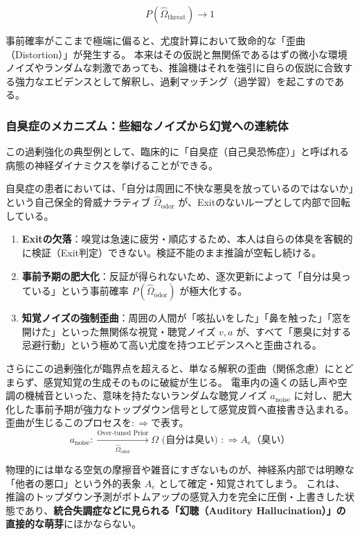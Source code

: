 \begin{equation}
    P(\hat{\Omega}_{\mathrm{threat}}) \longrightarrow 1
\end{equation}

事前確率がここまで極端に偏ると、尤度計算において致命的な「歪曲（Distortion）」が発生する。
本来はその仮説と無関係であるはずの微小な環境ノイズやランダムな刺激であっても、推論機はそれを強引に自らの仮説に合致する強力なエビデンスとして解釈し、過剰マッチング（過学習）を起こすのである。

\subsubsection{自臭症のメカニズム：些細なノイズから幻覚への連続体}
この過剰強化の典型例として、臨床的に「自臭症（自己臭恐怖症）」と呼ばれる病態の神経ダイナミクスを挙げることができる。

自臭症の患者においては、「自分は周囲に不快な悪臭を放っているのではないか」という自己保全的脅威ナラティブ $\hat{\Omega}_{\mathrm{odor}}$ が、Exitのないループとして内部で回転している。
\begin{enumerate}[label=(\arabic*)]
  \item \textbf{Exitの欠落}：嗅覚は急速に疲労・順応するため、本人は自らの体臭を客観的に検証（Exit判定）できない。検証不能のまま推論が空転し続ける。
  \item \textbf{事前予期の肥大化}：反証が得られないため、逐次更新によって「自分は臭っている」という事前確率 $P(\hat{\Omega}_{\mathrm{odor}})$ が極大化する。
  \item \textbf{知覚ノイズの強制歪曲}：周囲の人間が「咳払いをした」「鼻を触った」「窓を開けた」といった無関係な視覚・聴覚ノイズ $v, a$ が、すべて「悪臭に対する忌避行動」という極めて高い尤度を持つエビデンスへと歪曲される。
\end{enumerate}

さらにこの過剰強化が臨界点を超えると、単なる解釈の歪曲（関係念慮）にとどまらず、感覚知覚の生成そのものに破綻が生じる。
電車内の遠くの話し声や空調の機械音といった、意味を持たないランダムな聴覚ノイズ $a_{\mathrm{noise}}$ に対し、肥大化した事前予期が強力なトップダウン信号として感覚皮質へ直接書き込まれる。
歪曲が生じるこのプロセスを$:\Longrightarrow$で表す。
\begin{equation}
    a_{\mathrm{noise}} :\xrightarrow[\hat{\Omega}_{\mathrm{odor}}]{\text{Over-tuned Prior}} \Omega \text{ (自分は臭い) } :\Longrightarrow A_e \text{（臭い）}
\end{equation}

物理的には単なる空気の摩擦音や雑音にすぎないものが、神経系内部では明瞭な「他者の悪口」という外的表象 $A_e$ として確定・知覚されてしまう。
これは、推論のトップダウン予測がボトムアップの感覚入力を完全に圧倒・上書きした状態であり、\textbf{統合失調症などに見られる「幻聴（Auditory Hallucination）」の直接的な萌芽}にほかならない。

